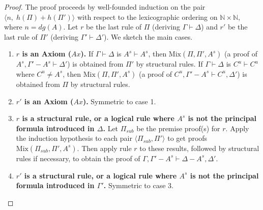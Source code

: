 \documentclass{article}
\newcommand{\seq}[2]{{#1} \vdash{} {#2}}
\newcommand{\pf}[2]{{#1}^{#2}} %
\newcommand{\cana}[1]{#1\!-\!\pf{A}{s}}
\theoremstyle{definition}
\begin{document}
\begin{proof}
The proof proceeds by well-founded induction on the pair $\langle n,\; h(\Pi) + h(\Pi') \rangle$ with respect to the lexicographic ordering on $\mathbb{N} \times \mathbb{N}$, where $n = dg(A)$. Let $r$ be the last rule of $\Pi$ (deriving $\seq{\Gamma}{\Delta}$) and $r'$ be the last rule of $\Pi'$ (deriving $\seq{\Gamma'}{\Delta'}$). We sketch the main cases.
\begin{enumerate}
    \item \textbf{$r$ is an Axiom ($Ax$).}
        If $\seq{\Gamma}{\Delta}$ is $\seq{\pf{A}{s}}{\pf{A}{s}}$, then $\text{Mix}(\Pi, \Pi', \pf{A}{s})$ (a proof of $\seq{\pf{A}{s}, \cana{\Gamma'}}{\Delta'}$) is obtained from $\Pi'$ by structural rules.
        If $\seq{\Gamma}{\Delta}$ is $\seq{\pf{C}{u}}{\pf{C}{u}}$ where $\pf{C}{u} \neq \pf{A}{s}$, then $\text{Mix}(\Pi, \Pi', \pf{A}{s})$ (a proof of $\seq{\pf{C}{u}, \cana{\Gamma'}}{\pf{C}{u}, \Delta'}$) is obtained from $\Pi$ by structural rules.

    \item \textbf{$r'$ is an Axiom ($Ax$).} Symmetric to case 1.

    \item \textbf{$r$ is a structural rule, or a logical rule where $\pf{A}{s}$ is not the principal formula introduced in $\Delta$.}
        Let $\Pi_{sub}$ be the premise proof(s) for $r$. Apply the induction hypothesis to each pair $\langle \Pi_{sub}, \Pi' \rangle$ to get proofs $\text{Mix}(\Pi_{sub}, \Pi', \pf{A}{s})$. Then apply rule $r$ to these results, followed by structural rules if necessary, to obtain the proof of $\seq{\Gamma, \cana{\Gamma'}}{\cana{\Delta}, \Delta'}$.

    \item \textbf{$r'$ is a structural rule, or a logical rule where $\pf{A}{s}$ is not the principal formula introduced in $\Gamma'$.} Symmetric to case 3.


\end{enumerate}
\end{proof}
\end{document}
